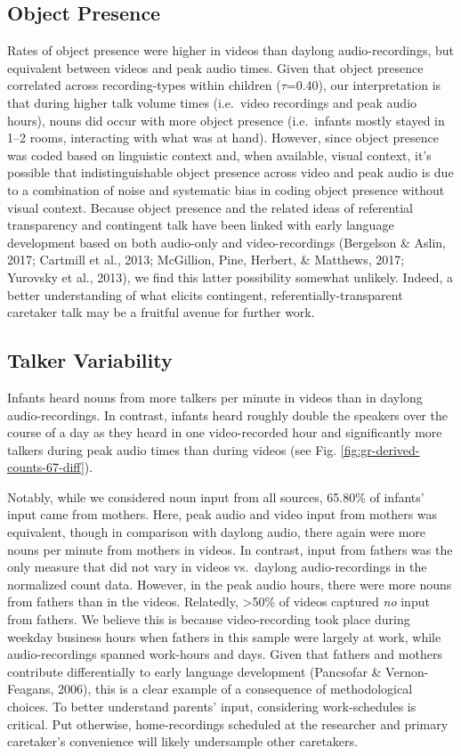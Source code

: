 \documentclass[man]{apa6}
\theoremstyle{definition}
\theoremstyle{definition}
\theoremstyle{definition}
\theoremstyle{remark}
\begin{document}
\subsection{Object Presence}\label{object-presence}

Rates of object presence were higher in videos than daylong
audio-recordings, but equivalent between videos and peak audio times.
Given that object presence correlated across recording-types within
children (\(\tau\)=0.40), our interpretation is that during higher talk
volume times (i.e.~video recordings and peak audio hours), nouns did
occur with more object presence (i.e.~infants mostly stayed in 1--2
rooms, interacting with what was at hand). However, since object
presence was coded based on linguistic context and, when available,
visual context, it's possible that indistinguishable object presence
across video and peak audio is due to a combination of noise and
systematic bias in coding object presence without visual context.
Because object presence and the related ideas of referential
transparency and contingent talk have been linked with early language
development based on both audio-only and video-recordings (Bergelson \&
Aslin, 2017; Cartmill et al., 2013; McGillion, Pine, Herbert, \&
Matthews, 2017; Yurovsky et al., 2013), we find this latter possibility
somewhat unlikely. Indeed, a better understanding of what elicits
contingent, referentially-transparent caretaker talk may be a fruitful
avenue for further work.

\subsection{Talker Variability}\label{talker-variability}

Infants heard nouns from more talkers per minute in videos than in
daylong audio-recordings. In contrast, infants heard roughly double the
speakers over the course of a day as they heard in one video-recorded
hour and significantly more talkers during peak audio times than during
videos (see Fig. \ref{fig:gr-derived-counts-67-diff}).

Notably, while we considered noun input from all sources, 65.80\% of
infants' input came from mothers. Here, peak audio and video input from
mothers was equivalent, though in comparison with daylong audio, there
again were more nouns per minute from mothers in videos. In contrast,
input from fathers was the only measure that did not vary in videos
vs.~daylong audio-recordings in the normalized count data. However, in
the peak audio hours, there were more nouns from fathers than in the
videos. Relatedly, \textgreater{}50\% of videos captured \emph{no} input
from fathers. We believe this is because video-recording took place
during weekday business hours when fathers in this sample were largely
at work, while audio-recordings spanned work-hours and days. Given that
fathers and mothers contribute differentially to early language
development (Pancsofar \& Vernon-Feagans, 2006), this is a clear example
of a consequence of methodological choices. To better understand
parents' input, considering work-schedules is critical. Put otherwise,
home-recordings scheduled at the researcher and primary caretaker's
convenience will likely undersample other caretakers.
\end{document}
